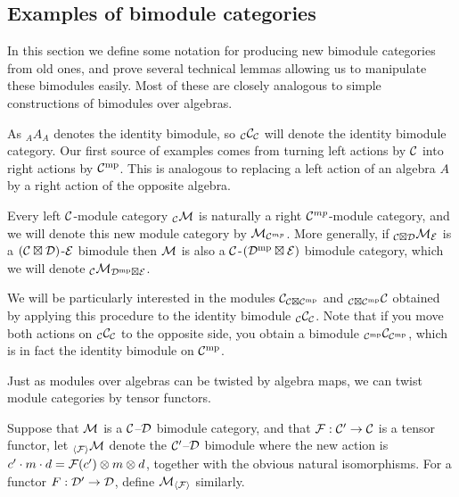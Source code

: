 \documentclass{amsart}
\begin{document}
\subsection{Examples of bimodule categories} \label{sec:examples_of_bimods}

In this section we define some notation for producing new bimodule categories from old ones, and prove several technical lemmas allowing us to manipulate these bimodules easily.  Most of these are closely analogous to simple constructions of bimodules over algebras.

As ${}_A A_A$ denotes the identity bimodule, so ${}_\mathcal C \mathcal C_{\mathcal C}$ will denote the identity bimodule category.  Our first source of examples comes from turning left actions by $\mathcal C$ into right actions by $\mathcal C^{\mathrm{mp}}$.  This is analogous to replacing a left action of an algebra $A$ by a right action of the opposite algebra.

\begin{definition}
Every left $\mathcal C$-module category ${}_\mathcal C \mathcal M$ is naturally a right $\mathcal C^{mp}$-module category, and we will denote this new module category by $\mathcal M_{\mathcal C^{mp}}$.  More generally, if ${}_{\mathcal C \boxtimes \mathcal D} \mathcal M_{\mathcal E}$ is a $(\mathcal C \boxtimes \mathcal D)$-$\mathcal E$ bimodule then $\mathcal M$ is also a $\mathcal C$-$(\mathcal D^{\mathrm{mp}} \boxtimes \mathcal E)$ bimodule category, which we will denote ${}_{\mathcal C}\mathcal M_{\mathcal D^{\mathrm{mp}} \boxtimes \mathcal E}$.
\end{definition}

We will be particularly interested in the modules $\mathcal C_{\mathcal C \boxtimes \mathcal C^{\mathrm{mp}}}$ and ${}_{\mathcal C \boxtimes \mathcal C^{\mathrm{mp}}} \mathcal C$ obtained by applying this procedure to the identity bimodule ${}_\mathcal C \mathcal C_\mathcal C$.  Note that if you move both actions on ${}_\mathcal C \mathcal C_\mathcal C$ to the opposite side, you obtain a bimodule ${}_{\mathcal C^{\mathrm{mp}}}\mathcal C_{\mathcal C^{\mathrm{mp}}}$, which is in fact the identity bimodule on $\mathcal C^{\mathrm{mp}}$.

Just as modules over algebras can be twisted by algebra maps, we can twist module categories by tensor functors.

\begin{definition}
Suppose that $\mathcal M$ is a $\mathcal C$--$\mathcal D$ bimodule category, and that $\mathcal F: \mathcal C' \rightarrow \mathcal C$ is a tensor functor, let
${}_{\langle \mathcal F \rangle} \mathcal M$ denote the $\mathcal C'$--$\mathcal D$ bimodule where the new action is $c' \cdot m \cdot d = \mathcal F(c') \otimes m \otimes d$, together with the obvious natural isomorphisms.  For a functor $F: \mathcal D' \rightarrow \mathcal D$, define $\mathcal M_{\langle \mathcal F \rangle}$ similarly.
\end{definition}
\end{document}
